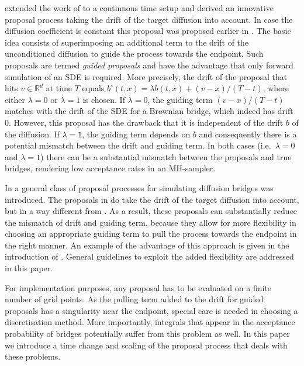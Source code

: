 \documentclass[preprint]{imsart}
\newcommand{\la}{\lambda}
\newcommand{\RR}{\mathbb{R}}
\theoremstyle{definition}
\begin{document}
\cite{DelyonHu} extended the work of \cite{DurhamGallant} to a continuous time setup and derived an  innovative proposal process taking the drift of the target diffusion into account. In case the diffusion coefficient is constant this proposal was proposed earlier in  \cite{Clark}.
The basic idea consists of superimposing an additional term to the drift of the unconditioned diffusion to guide the process towards the endpoint. Such proposals are termed {\it guided proposals} and have the advantage that only forward simulation of an SDE is required. More precisely, the drift of the proposal that hits $v\in \RR^d$ at time $T$ equals $b^\circ(t,x) = \la b(t,x) + (v-x)/(T-t)$, where either $\la=0$ or $\la=1$ is chosen. If $\la=0$, the guiding term $(v-x)/(T-t)$ matches with the drift of the SDE for a Brownian bridge, which indeed has drift $0$. However,  this  proposal has the drawback that it is independent of the drift $b$ of the diffusion. If $\la=1$, the guiding term  depends on $b$ and consequently there is a potential mismatch between the drift and guiding term. In both cases (i.e.\ $\la=0$ and $\la=1$) there can be a substantial mismatch between the proposals and true bridges, rendering low acceptance rates in an MH-sampler.  


In \cite{Schauer} a general class of proposal processes for simulating diffusion bridges was introduced. The proposals in \cite{Schauer} do take the drift of the target diffusion into account, but in a way different from \cite{DelyonHu}. As a result, these proposals can substantially reduce the mismatch of drift and guiding term, because they allow for more flexibility in choosing an appropriate guiding term to pull the process towards the endpoint in the right manner.  An example of the advantage of this approach  is given in the introduction of \cite{Schauer}. General guidelines to exploit the added flexibility are addressed in this paper. 

For implementation purposes, any proposal has to be evaluated on a finite number of grid points. As the pulling term added to the drift for guided proposals has a singularity near the endpoint, special care is needed in choosing a discretisation method. More importantly, integrals that appear in the acceptance probability of bridges potentially suffer from this  problem as well. In this paper we introduce a time change and scaling of the proposal process that deals with these problems. 

\medskip
\end{document}
